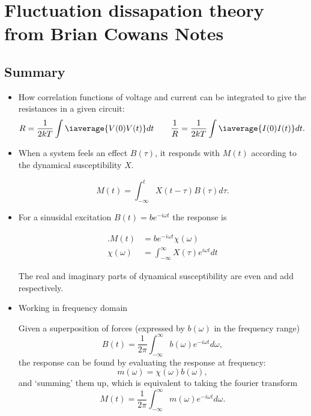 \section{Fluctuation dissapation theory from Brian Cowans Notes}
\label{sec:fluctuationDissapation}

\subsection{Summary}
\begin{itemize}
\item How correlation functions of voltage  and current can be integrated to give
  the resistances in a given circuit:
  \[
    {R}                                                                         =
    \frac{1}{2kT}\int\iaverage{V(0)V(t)}dt\qquad\frac{1}{R}=\frac{1}{2kT}\int\iaverage{I(0)I(t)}dt.
  \]
\item When a system feels an effect $ B(\tau) $, it responds with $ M(t) $ according
  to the dynamical susceptibility $ X $.

  \begin{framed}\noindent
    \begin{equation}
      M(t) = \int_{-\infty}^{t}X(t - \tau)B(\tau)d\tau.
    \end{equation}
  \end{framed}
\item For a sinusidal excitation $ B(t) = be^{-i\omega t} $ the response is
  \begin{framed}\noindent
    \begin{equation}
      \begin{aligned}.M(t)    &=    be^{-i\omega   t}\chi(\omega)\\    \chi(\omega)    &=
        \int_{-\infty}^{\infty}X(\tau)e^{i\omega t}dt
      \end{aligned}
    \end{equation}
  \end{framed}

  The  real and  imaginary parts  of dynamical  susceptibility are  even and  add
  respectively.

\item Working in frequency domain
  \begin{framed}\noindent
    Given a superposition of forces (expressed  by $ b(\omega) $ in the frequency
    range)
    \begin{equation}
      B(t)     =    \frac{1}{2\pi}\int_{-\infty}^{\infty}b(\omega)e^{-i\omega
        t}d\omega,
    \end{equation}
    \noindent the response can be found by evaluating the response at frequency:
    \begin{equation}
      m(\omega) = \chi(\omega)b(\omega),
    \end{equation}
    \noindent and  `summing' them up, which  is equivalent to taking  the fourier
    transform
    \begin{equation}
      M(t)     =    \frac{1}{2\pi}\int_{-\infty}^{\infty}m(\omega)e^{-i\omega
        t}d\omega.
    \end{equation}
  \end{framed}
\end{itemize}


